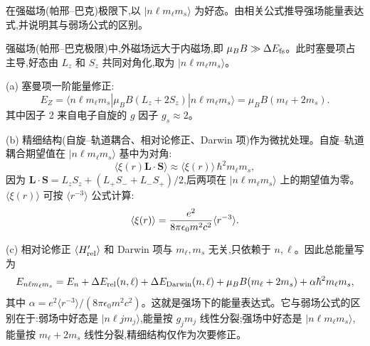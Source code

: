 \begin{question}
在强磁场(帕邢--巴克)极限下,以 $|n\ell m_\ell m_s\rangle$ 为好态。由相关公式推导强场能量表达式,并说明其与弱场公式的区别。
\end{question}
\begin{solution}
强磁场(帕邢--巴克极限)中,外磁场远大于内磁场,即 $\mu_B B \gg \Delta E_{\rm fs}$。此时塞曼项占主导,好态由 $L_z$ 和 $S_z$ 共同对角化,取为 $|n\ell m_\ell m_s\rangle$。

(a) 塞曼项一阶能量修正:
\[
E_Z = \langle n\ell m_\ell m_s|\mu_B B(L_z+2S_z)|n\ell m_\ell m_s\rangle
= \mu_B B(m_\ell + 2m_s).
\]
其中因子 2 来自电子自旋的 $g$ 因子 $g_s\approx2$。

(b) 精细结构(自旋--轨道耦合、相对论修正、Darwin 项)作为微扰处理。自旋--轨道耦合期望值在 $|n\ell m_\ell m_s\rangle$ 基中为对角:
\[
\langle \xi(r)\mathbf L\cdot\mathbf S\rangle
\approx \langle \xi(r)\rangle \,\hbar^2 m_\ell m_s,
\]
因为 $\mathbf L\cdot\mathbf S = L_z S_z + (L_+S_-+L_-S_+)/2$,后两项在 $|n\ell m_\ell m_s\rangle$ 上的期望值为零。$\langle\xi(r)\rangle$ 可按 $\langle r^{-3}\rangle$ 公式计算:
\[
\langle \xi(r)\rangle = {e^2\over8\pi\epsilon_0 m^2c^2}\langle r^{-3}\rangle.
\]

(c) 相对论修正 $\langle H_{\rm rel}'\rangle$ 和 Darwin 项与 $m_\ell,m_s$ 无关,只依赖于 $n,\ell$。因此总能量写为
\[
E_{n\ell m_\ell m_s} = E_n + \Delta E_{\rm rel}(n,\ell) + \Delta E_{\rm Darwin}(n,\ell) + \mu_B B(m_\ell+2m_s) + \alpha \hbar^2 m_\ell m_s,
\]
其中 $\alpha = e^2\langle r^{-3}\rangle/(8\pi\epsilon_0 m^2c^2)$。这就是强场下的能量表达式。它与弱场公式的区别在于:弱场中好态是 $|n\ell j m_j\rangle$,能量按 $g_j m_j$ 线性分裂;强场中好态是 $|n\ell m_\ell m_s\rangle$,能量按 $m_\ell+2m_s$ 线性分裂,精细结构仅作为次要修正。
\end{solution}

